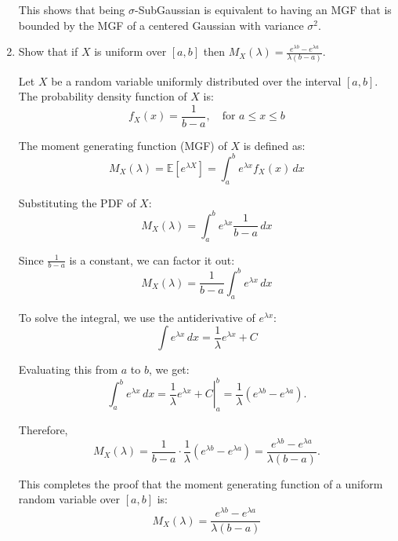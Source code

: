 \documentclass[a4 paper]{article}
\numberwithin{equation}{section}
\theoremstyle{boldStyle}
\theoremstyle{boldBlueStyle}
\theoremstyle{boldPurpleStyle}
\theoremstyle{boldRedStyle}
\begin{document}
\begin{enumerate}
This shows that being \(\sigma\)-SubGaussian is equivalent to having an MGF that is bounded by the MGF of a centered Gaussian with variance \(\sigma^2\).









    
    
\newpage
\item \textcolor{blueColor}{Show that if \(X\) is uniform over \([a, b]\) then \(M_X(\lambda) = \frac{e^{\lambda b} - e^{\lambda a}}{\lambda (b - a)}\).}

Let \(X\) be a random variable uniformly distributed over the interval \([a, b]\). The probability density function of \(X\) is:
\[
f_X(x) = \frac{1}{b-a}, \quad \text{for } a \leq x \leq b
\]

The moment generating function (MGF) of \(X\) is defined as:
\[
M_X(\lambda) = \mathbb{E}[e^{\lambda X}] = \int_{a}^{b} e^{\lambda x} f_X(x) \, dx
\]

Substituting the PDF of \(X\):
\[
M_X(\lambda) = \int_{a}^{b} e^{\lambda x} \frac{1}{b-a} \, dx
\]

Since \(\frac{1}{b-a}\) is a constant, we can factor it out:
\[
M_X(\lambda) = \frac{1}{b-a} \int_{a}^{b} e^{\lambda x} \, dx
\]

To solve the integral, we use the antiderivative of \(e^{\lambda x}\):
\[
\int e^{\lambda x} \, dx = \frac{1}{\lambda} e^{\lambda x} + C
\]

Evaluating this from \(a\) to \(b\), we get:
\[
\int_{a}^{b} e^{\lambda x} \, dx = \left. \frac{1}{\lambda} e^{\lambda x} + C \right|_{a}^{b} = \frac{1}{\lambda} \left( e^{\lambda b} - e^{\lambda a} \right).
\]

Therefore,
\[
M_X(\lambda) = \frac{1}{b-a} \cdot \frac{1}{\lambda} \left( e^{\lambda b} - e^{\lambda a} \right) = \frac{e^{\lambda b} - e^{\lambda a}}{\lambda (b - a)}.
\]

This completes the proof that the moment generating function of a uniform random variable over \([a, b]\) is:
\[
M_X(\lambda) = \frac{e^{\lambda b} - e^{\lambda a}}{\lambda (b - a)}
\]




\end{enumerate}
\end{document}
